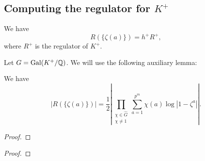 \subsection{Computing the regulator for $K^+$}

\begin{lemma}\label{lem:reg_Ra}
    We have
    $$
    R(\{\zeta(a)\}) = h^+ R^+, 
    $$
    where $R^+$ is the regulator of $K^+$.
\end{lemma}

Let $G = \operatorname{Gal}(K^+ / \mathbb{Q})$. We will use the following auxiliary lemma:

\begin{lemma}\label{lem:reg_Ra_charsum}
    We have 
    $$
    | R(\{\zeta(a)\}) | = \frac{1}{2} \left | \prod_{\substack{\chi \in \widehat{G} \\ \chi \ne 1}} \sum_{a = 1}^{p^m} \chi(a) \log |1 - \zeta^a| \right |. 
    $$
\end{lemma}

\begin{proof}
\end{proof}

\begin{proof}
     
\end{proof}

